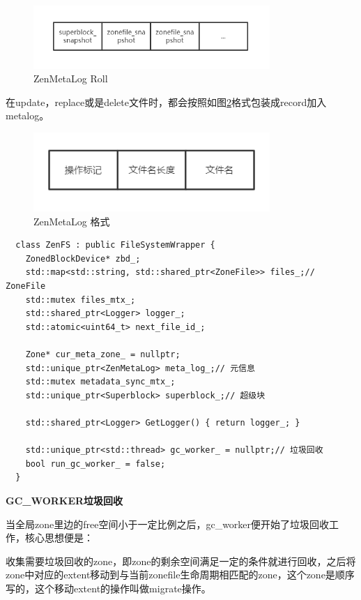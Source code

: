 \begin{figure}[htbp]
  \centering
  \includegraphics[width=0.8\textwidth]{fig/roll_metazone_init}
  \caption{ZenMetaLog Roll}
  \label{roll_metazone_init}
\end{figure}

在update，replace或是delete文件时，都会按照如图\ref{manipulate_form}格式包装成record加入metalog。

\begin{figure}[htbp]
  \centering
  \includegraphics[width=0.8\textwidth]{fig/manipulate_form}
  \caption{ZenMetaLog 格式}
  \label{manipulate_form}
\end{figure}


\begin{lstlisting}
  class ZenFS : public FileSystemWrapper {
    ZonedBlockDevice* zbd_;
    std::map<std::string, std::shared_ptr<ZoneFile>> files_;// ZoneFile
    std::mutex files_mtx_;
    std::shared_ptr<Logger> logger_;
    std::atomic<uint64_t> next_file_id_;
  
    Zone* cur_meta_zone_ = nullptr;
    std::unique_ptr<ZenMetaLog> meta_log_;// 元信息
    std::mutex metadata_sync_mtx_;
    std::unique_ptr<Superblock> superblock_;// 超级块
  
    std::shared_ptr<Logger> GetLogger() { return logger_; }
  
    std::unique_ptr<std::thread> gc_worker_ = nullptr;// 垃圾回收
    bool run_gc_worker_ = false;
  }  
\end{lstlisting}

\textbf{GC\_WORKER垃圾回收}

当全局zone里边的free空间小于一定比例之后，gc\_worker便开始了垃圾回收工作，核心思想便是：

收集需要垃圾回收的zone，即zone的剩余空间满足一定的条件就进行回收，之后将zone中对应的extent移动到与当前zonefile生命周期相匹配的zone，这个zone是顺序写的，这个移动extent的操作叫做migrate操作。

